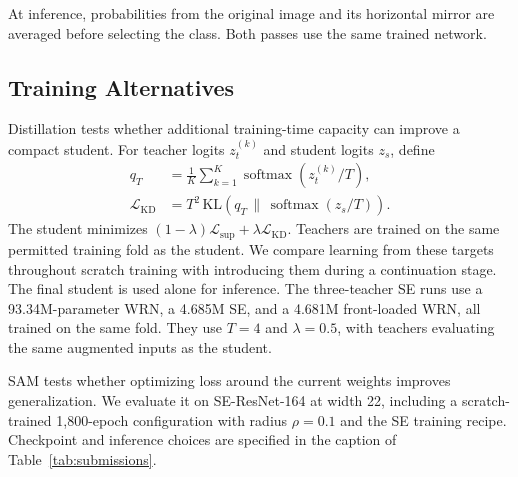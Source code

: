 \documentclass[letterpaper]{article} %
\begin{document}
At inference, probabilities from the original image and its horizontal mirror are averaged before selecting the class. Both passes use the same trained network.

\subsection{Training Alternatives}
Distillation tests whether additional training-time capacity can improve a compact student. For teacher logits $z_t^{(k)}$ and student logits $z_s$, define
\begin{align}
 q_T &= \frac{1}{K}\sum_{k=1}^{K}\operatorname{softmax}(z_t^{(k)}/T),\\
 \mathcal L_{\mathrm{KD}} &= T^2\,\mathrm{KL}\!\left(q_T\,\|\,\operatorname{softmax}(z_s/T)\right).
\end{align}
The student minimizes $(1-\lambda)\mathcal L_{\mathrm{sup}}+\lambda\mathcal L_{\mathrm{KD}}$. Teachers are trained on the same permitted training fold as the student. We compare learning from these targets throughout scratch training with introducing them during a continuation stage. The final student is used alone for inference. The three-teacher SE runs use a 93.34M-parameter WRN, a 4.685M SE, and a 4.681M front-loaded WRN, all trained on the same fold. They use $T=4$ and $\lambda=0.5$, with teachers evaluating the same augmented inputs as the student.

SAM tests whether optimizing loss around the current weights improves generalization. We evaluate it on SE-ResNet-164 at width 22, including a scratch-trained 1,800-epoch configuration with radius $\rho=0.1$ and the SE training recipe. Checkpoint and inference choices are specified in the caption of Table~\ref{tab:submissions}.
\end{document}
